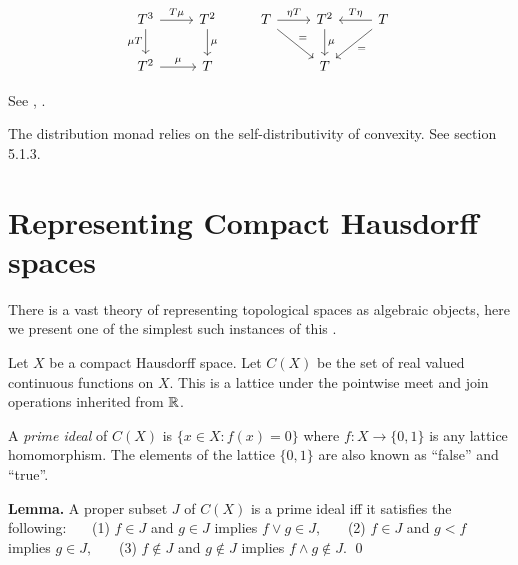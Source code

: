 \documentclass[11pt]{article}
\begin{document}
\[
\begin{tikzcd}
T^3 \arrow{r}{T\mu} \arrow[swap]{d}{\mu T} & T^2 \arrow{d}{\mu} & 
T \arrow{r}{\eta T}\arrow{dr}{=} & T^2 \arrow{d}{\mu} & \arrow[swap]{l}{T\eta}\arrow{dl}{=} T \\
T^2 \arrow{r}{\mu} & T & 
& T & 
\end{tikzcd}
\]


See \cite{Mac1978}, \cite{Jacobs2012}.

The distribution monad relies on the self-distributivity of convexity.
See \cite{Jacobs2012} section 5.1.3.


%
%

\section{Representing Compact Hausdorff spaces}


There is a vast theory of representing topological spaces as
algebraic objects, here we present one of the simplest such
instances of this
\cite{Nagata1985}.


Let $X$ be a compact Hausdorff space.
Let $C(X)$ be the set of real valued continuous functions on $X$.
This is a lattice under the pointwise meet and join operations inherited from $\mathbb R$.

A \emph{prime ideal} of $C(X)$ is $\{x\in X:f(x)=0\}$ where $f:X\to \{0,1\}$
is any lattice homomorphism. 
The elements of the lattice $\{0, 1\}$ are also known as 
``false'' and ``true''.

{\bf Lemma.} A proper subset $J$ of $C(X)$ is a prime ideal
iff it satisfies the following:\newline
\ \ \ (1) $f\in J$ and $g\in J$ implies $f\vee g \in J,$ \newline
\ \ \ (2) $f\in J$ and $g<f$ implies $g\in J,$ \newline
\ \ \ (3) $f\notin J$ and $g\notin J$ implies $f\wedge g\notin J.$
\qed
\end{document}
